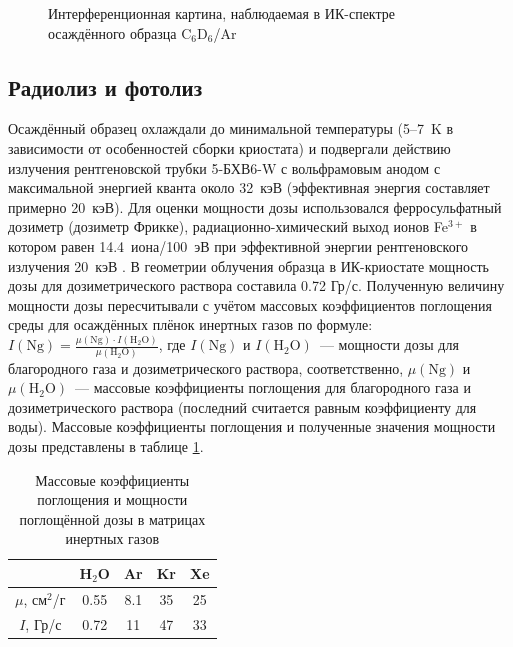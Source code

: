 \begin{figure}[H]
\caption{Интерференционная картина, наблюдаемая в ИК-спектре осаждённого образца C$_6$D$_6$/Ar}
\label{inter}
\end{figure}
\subsection{Радиолиз и фотолиз}
Осаждённый образец охлаждали до минимальной температуры (5--7~K в зависимости от особенностей сборки криостата) 
и подвергали действию излучения рентгеновской трубки 5-БХВ6-W с вольфрамовым анодом с максимальной энергией кванта около 32~кэВ 
(эффективная энергия составляет примерно 20~кэВ).
Для оценки мощности дозы использовался ферросульфатный дозиметр (дозиметр Фрикке), радиационно-химический выход ионов Fe$^{3+}$
 в котором равен 14.4~иона/100~эВ при эффективной энергии рентгеновского излучения 20~кэВ \cite{Pikaev}. 
 В геометрии облучения образца в ИК-криостате мощность дозы для дозиметрического раствора составила 0.72 Гр/с.
 Полученную величину мощности дозы пересчитывали с учётом массовых коэффициентов поглощения среды для осаждённых плёнок инертных газов 
 по формуле:
$I(\mathrm{Ng}) = \frac{\mu(\mathrm{Ng})\cdot I(\mathrm{H_2O})}{\mu(\mathrm{H_2O})}$, где $I(\mathrm{Ng})$ и $I(\mathrm{H_2O})$~--- мощности дозы для благородного газа и дозиметрического раствора, соответственно, $\mu(\mathrm{Ng})$ и $\mu(\mathrm{H_2O})$~--- массовые коэффициенты поглощения для благородного газа и дозиметрического раствора (последний считается равным коэффициенту для воды). Массовые коэффициенты поглощения и полученные значения мощности дозы представлены в таблице \ref{dose}.
\begin{table}[H]
\caption{Массовые коэффициенты поглощения \cite{xray} и мощности поглощённой дозы в матрицах инертных газов}
\label{dose}
\begin{center}
\begin{tabular}{c|cccc}
 & H$_2$O & Ar & Kr & Xe \\
 \hline
$\mu$, см$^2$/г & 0.55 & 8.1 & 35 & 25 \\
$I$, Гр/с & 0.72 & 11 & 47 & 33 \\
\end{tabular}
\end{center}
\end{table}

